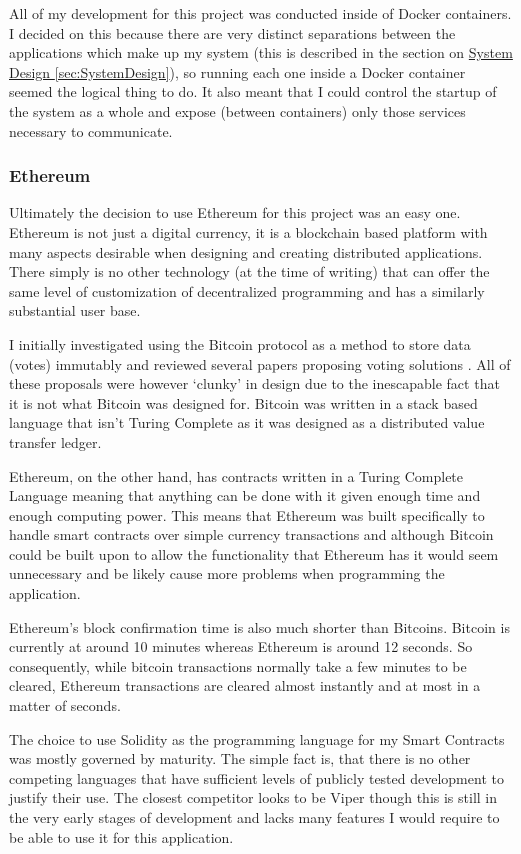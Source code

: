 \documentclass{article}
\begin{document}
All of my development for this project was conducted inside of Docker containers. I decided on this because there are very distinct separations between the applications which make up my system (this is described in the section on \hyperref[sec:SystemDesign]{System Design \ref*{sec:SystemDesign}}), so running each one inside a Docker container seemed the logical thing to do. It also meant that I could control the startup of the system as a whole and expose (between containers) only those services necessary to communicate.

\clearpage
\subsubsection{Ethereum}
Ultimately the decision to use Ethereum for this project was an easy one. Ethereum is not just a digital currency, it is a blockchain based platform with many aspects desirable when designing and creating distributed applications. There simply is no other technology (at the time of writing) that can offer the same level of customization of decentralized programming and has a similarly substantial user base.

I initially investigated using the Bitcoin protocol as a method to store data (votes) immutably and reviewed several papers proposing voting solutions \citep{60_flint_2017}. All of these proposals were however `clunky' in design due to the inescapable fact that it is not what Bitcoin was designed for. Bitcoin was written in a stack based language that isn't Turing Complete as it was designed as a distributed value transfer ledger. 

Ethereum, on the other hand, has contracts written in a Turing Complete Language meaning that anything can be done with it given enough time and enough computing power. This means that Ethereum was built specifically to handle smart contracts over simple currency transactions and although Bitcoin could be built upon to allow the functionality that Ethereum has it would seem unnecessary and be likely cause more problems when programming the application.

Ethereum's block confirmation time is also much shorter than Bitcoins. Bitcoin is currently at around 10 minutes whereas Ethereum is around 12 seconds. So consequently, while bitcoin transactions normally take a few minutes to be cleared, Ethereum transactions are cleared almost instantly and at most in a matter of seconds.

The choice to use Solidity as the programming language for my Smart Contracts was mostly governed by maturity. The simple fact is, that there is no other competing languages that have sufficient levels of publicly tested development to justify their use. The closest competitor looks to be Viper \citep{61_ethereum_viper_2017} though this is still in the very early stages of development and lacks many features I would require to be able to use it for this application.
\end{document}
